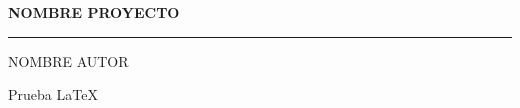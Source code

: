 \documentclass[a4paper,12pt]{article} %
\newcommand{\Nombre}{NOMBRE AUTOR}
\newcommand{\Proyecto}{NOMBRE PROYECTO}
\begin{document}
\cfoot{\thepage}
\begin{titlepage}
    \begin{center}
        \huge\textbf{\Proyecto}
    \end{center}
    \hfill{}
    {\color{orangePortada}\hrule}
    \vfill{}
    \begin{center}
    \end{center}
    \vfill{}
    \begin{center}
        {\large{} \Nombre}
    \end{center}
\end{titlepage}
\clearpage{}
\tableofcontents{}
\thispagestyle{empty}
\clearpage{}
Prueba \LaTeX{}
\printbibliography{}
\end{document}
